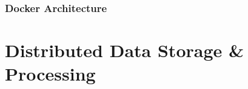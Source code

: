 \documentclass{report}
\begin{document}
	\section{Docker Architecture}
	

 
	\part{Distributed Data Storage \& Processing}
\end{document}
